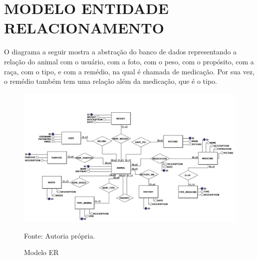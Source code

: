 \section{MODELO ENTIDADE RELACIONAMENTO}

O diagrama a seguir mostra a abstração do banco de dados representando a relação do animal
com o usuário, com a foto, com o peso, com o propósito, com a raça, com o tipo, e com a remédio,
na qual é chamada de medicação. Por sua vez, o remédio também tem uma relação além da
medicação, que é o tipo.

\begin{figure}[H]
	\begin{center}
		\caption{Modelo ER}
		\includegraphics[width=\textwidth]{../img/erdoboi.jpg}

		Fonte: Autoria própria.
	\end{center}
	\label{er}
\end{figure}
